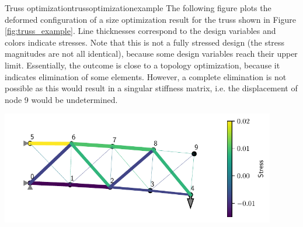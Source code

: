 \begin{example}{Truss optimization}{trussoptimizationexample}
    The following figure plots the deformed configuration of a size optimization result for the truss shown in Figure \ref{fig:truss_example}. Line thicknesses correspond to the design variables and colors indicate stresses. Note that this is not a fully stressed design (the stress magnitudes are not all identical), because some design variables reach their upper limit. Essentially, the outcome is close to a topology optimization, because it indicates elimination of some elements. However, a complete elimination is not possible as this would result in a singular stiffness matrix, i.e. the displacement of node 9 would be undetermined. 

    \begin{center}
        \includegraphics[width=0.9\textwidth]{figures/truss_sample_optimized.pdf} 
    \end{center}
\end{example}

